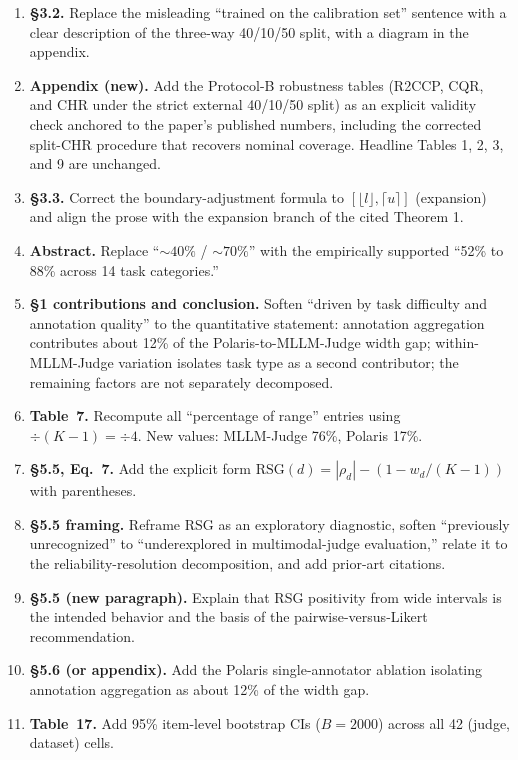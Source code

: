 \documentclass[11pt]{article}
\begin{document}
\begin{enumerate}[leftmargin=*]
\item \textbf{\S 3.2.} Replace the misleading ``trained on the calibration set'' sentence with a clear description of the three-way 40/10/50 split, with a diagram in the appendix.
\item \textbf{Appendix (new).} Add the Protocol-B robustness tables (R2CCP, CQR, and CHR under the strict external 40/10/50 split) as an explicit validity check anchored to the paper's published numbers, including the corrected split-CHR procedure that recovers nominal coverage. Headline Tables 1, 2, 3, and 9 are unchanged.
\item \textbf{\S 3.3.} Correct the boundary-adjustment formula to $[\lfloor l \rfloor, \lceil u \rceil]$ (expansion) and align the prose with the expansion branch of the cited Theorem 1.
\item \textbf{Abstract.} Replace ``$\sim 40\%$ / $\sim 70\%$'' with the empirically supported ``52\% to 88\% across 14 task categories.''
\item \textbf{\S 1 contributions and conclusion.} Soften ``driven by task difficulty and annotation quality'' to the quantitative statement: annotation aggregation contributes about 12\% of the Polaris-to-MLLM-Judge width gap; within-MLLM-Judge variation isolates task type as a second contributor; the remaining factors are not separately decomposed.
\item \textbf{Table~7.} Recompute all ``percentage of range'' entries using $\div(K-1) = \div 4$. New values: MLLM-Judge 76\%, Polaris 17\%.
\item \textbf{\S 5.5, Eq.\ 7.} Add the explicit form $\text{RSG}(d) = |\rho_d| - (1 - w_d/(K-1))$ with parentheses.
\item \textbf{\S 5.5 framing.} Reframe RSG as an exploratory diagnostic, soften ``previously unrecognized'' to ``underexplored in multimodal-judge evaluation,'' relate it to the reliability-resolution decomposition, and add prior-art citations.
\item \textbf{\S 5.5 (new paragraph).} Explain that RSG positivity from wide intervals is the intended behavior and the basis of the pairwise-versus-Likert recommendation.
\item \textbf{\S 5.6 (or appendix).} Add the Polaris single-annotator ablation isolating annotation aggregation as about 12\% of the width gap.
\item \textbf{Table~17.} Add 95\% item-level bootstrap CIs ($B = 2000$) across all 42 (judge, dataset) cells.
\end{enumerate}
\end{document}
